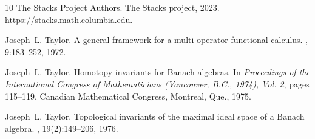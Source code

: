 \documentclass[11pt,a4paper]{amsart}
\numberwithin{equation}{section}
\theoremstyle{plain}
\theoremstyle{definition}
\theoremstyle{remark}
\begin{document}
\begin{thebibliography}{10}
The {Stacks Project Authors}.
\newblock The {Stacks} project, 2023.
\newblock \url{https://stacks.math.columbia.edu}.

Joseph~L. Taylor.
\newblock A general framework for a multi-operator functional calculus.
, 9:183--252, 1972.

Joseph~L. Taylor.
\newblock Homotopy invariants for {B}anach algebras.
\newblock In {\em Proceedings of the International Congress of Mathematicians
  (Vancouver, B.C., 1974), Vol. 2}, pages 115--119. Canadian Mathematical
  Congress, Montreal, Que., 1975.

Joseph~L. Taylor.
\newblock Topological invariants of the maximal ideal space of a {B}anach
  algebra.
, 19(2):149--206, 1976.

\end{thebibliography}
 
\end{document}
